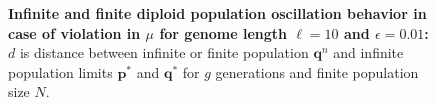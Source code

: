 \begin{figure}[H]
\begin{center}
\hspace{5pt}
\hspace{5pt}


\caption{\textbf{Infinite and finite diploid population oscillation behavior in case of violation in $\mu$ for genome length $\ell = 10$ and $\epsilon = 0.01$:} $d$ is
  distance between infinite or finite population ${\bm q}^n$ and infinite
  population limits ${{\bm p}^\ast}$ and ${{\bm q}^{\ast}}$ for $g$ generations and finite population size $N$.}
\label{oscillation_10d_vio_mu_0.01}
\end{center}
\end{figure}



